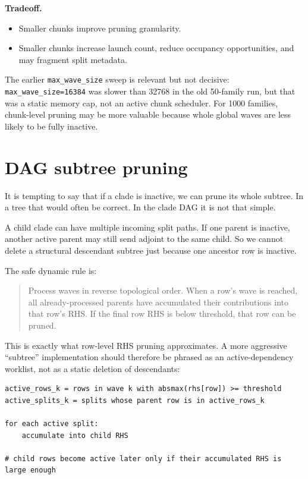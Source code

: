 \documentclass[11pt]{article}
\newcommand{\code}[1]{\texttt{#1}}
\begin{document}
\textbf{Tradeoff.}

\begin{itemize}[leftmargin=*]
\item Smaller chunks improve pruning granularity.
\item Smaller chunks increase launch count, reduce occupancy opportunities, and
      may fragment split metadata.
\end{itemize}

The earlier \code{max\_wave\_size} sweep is relevant but not decisive:
\code{max\_wave\_size=16384} was slower than 32768 in the old 50-family run,
but that was a static memory cap, not an active chunk scheduler.  For 1000
families, chunk-level pruning may be more valuable because whole global waves
are less likely to be fully inactive.

\section{DAG subtree pruning}

It is tempting to say that if a clade is inactive, we can prune its whole
subtree.  In a tree that would often be correct.  In the clade DAG it is not
that simple.

A child clade can have multiple incoming split paths.  If one parent is
inactive, another active parent may still send adjoint to the same child.  So
we cannot delete a structural descendant subtree just because one ancestor row
is inactive.

The safe dynamic rule is:

\begin{quote}
Process waves in reverse topological order.  When a row's wave is reached,
all already-processed parents have accumulated their contributions into that
row's RHS.  If the final row RHS is below threshold, that row can be pruned.
\end{quote}

This is exactly what row-level RHS pruning approximates.  A more aggressive
``subtree'' implementation should therefore be phrased as an active-dependency
worklist, not as a static deletion of descendants:

\begin{lstlisting}
active_rows_k = rows in wave k with absmax(rhs[row]) >= threshold
active_splits_k = splits whose parent row is in active_rows_k

for each active split:
    accumulate into child RHS

# child rows become active later only if their accumulated RHS is large enough
\end{lstlisting}
\end{document}
